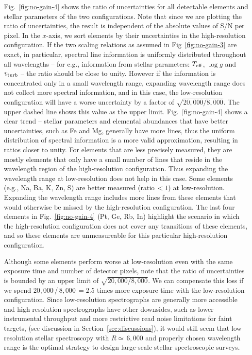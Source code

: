 \documentclass[iop]{emulateapj}
\begin{document}
\begin{CJK*}{UTF8}{gbsn}
Fig.~\ref{fig:no-gain-4} shows the ratio of uncertainties for all detectable elements and stellar parameters of the two configurations. Note that since we are plotting the ratio of uncertainties, the result is independent of the absolute values of S/N per pixel. In the $x$-axis, we sort elements by their uncertainties in the high-resolution configuration. If the two scaling relations as assumed in Fig~\ref{fig:no-gain-3} are exact, in particular, spectral line information is uniformly distributed throughout all wavelengths -- for e.g., information from stellar parameters: $T_{\rm eff}$, $\log g$ and $v_{\rm turb}$ -- the ratio should be close to unity. However if the information is concentrated only in a small wavelength range, expanding wavelength range does not collect more spectral information, and in this case, the low-resolution configuration will have a worse uncertainty by a factor of $\sqrt{20,000/8,000}$. The upper dashed line shows this value as the upper limit. Fig.~\ref{fig:no-gain-4} shows a clear trend -- stellar parameters and elemental abundances that have better uncertainties, such as Fe and Mg, generally have more lines, thus the uniform distribution of spectral information is a more valid approximation, resulting in ratios closer to unity. For elements that are less precisely measured, they are mostly elements that only have a small number of lines that reside in the wavelength region of the high-resolution configuration. Thus expanding the wavelength range at low-resolution does not help in this case.  Some elements (e.g., Na, Ba, K, Zn, S) are better measured (ratio$\, < 1$) at low-resolution. Expanding the wavelength range includes more lines from these elements that would otherwise be missed by the high-resolution configuration. The last four elements in Fig.~\ref{fig:no-gain-4} (Pt, Ge, Rb, In) highlight the scenario in which the high-resolution configuration does not cover any transitions of these elements, and so these elements are unmeasureable for this particular high-resolution configuration.

Although some elements perform worse at low-resolution even with the same exposure time and number of detector pixels, note that the ratio of uncertainties is bounded by an upper limit of $\sqrt{20,000/8,000}$. We can compensate this loss if we spend 20$,$000$\,$/$\,$8$,$000$\, = 2.5$ times more exposure time with the low-resolution configuration. Since low-resolution spectrographs are generally more accessible and high-resolution spectrographs have other downsides, such as lower instrumental throughput and more restrictive read noise limitations for faint targets, (see discussion in Section~\ref{sec:discussions}), it would still seem that low-resolution stellar spectroscopy with $R \simeq \,$6$,$000 and properly chosen wavelength range is the optimal strategy to design large-scale stellar spectroscopic surveys.



\end{CJK*}
\end{document}
